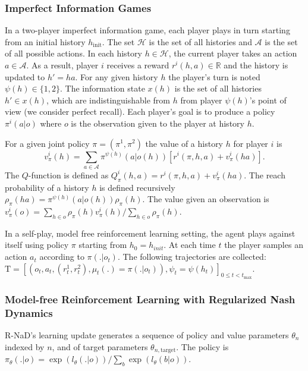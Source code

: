 \subsubsection{Imperfect Information Games}
In a two-player imperfect information game, each player plays in turn starting from an initial history $h_{\textrm{init}}$. The set $\mathcal{H}$ is the set of all histories and $\mathcal{A}$ is the set of all possible actions. In each history $h\in \mathcal{H}$, the current player takes an action $a\in \mathcal{A}$. As a result, player $i$ receives a reward $r^i(h, a)\in \mathbb{R}$ and the history is updated to $h'=ha$. For any given history $h$ the player's turn is noted $\psi(h) \in \{1, 2\}$. The information state $x(h)$ is the set of all histories $h' \in x(h)$, which are indistinguishable from $h$ from player $\psi(h)$'s point of view (we consider perfect recall). Each player's goal is to produce a policy $\pi^i(a|o)$ where $o$ is the observation given to the player at history $h$.

For a given joint policy $\pi = (\pi^1, \pi^2)$ the value of a history $h$ for player $i$ is
$$v^i_\pi(h) = \sum_{a \in \mathcal{A}} \pi^{\psi(h)}(a|o(h))\left[r^i(\pi, h, a) + v^i_\pi(ha)\right].$$
The $Q$-function is defined as $Q^i_\pi(h, a) = r^i(\pi, h, a) + v^i_\pi(ha)$. The reach probability of a history $h$ is defined recursively $\rho_\pi(ha) = \pi^{\psi(h)}(a|o(h))\rho_\pi(h)$. The value given an observation is $v^i_\pi(o) = \sum_{h\in o}\rho_\pi(h) v^i_\pi(h) / \sum_{h\in o}\rho_\pi(h)$.

In a self-play, model free reinforcement learning setting, the agent plays against itself using policy $\pi$ starting from $h_0 = h_{init}$. At each time $t$ the player samples an action $a_t$ according to $\pi(.|o_t)$. The following trajectories are collected: $\mathrm{T} = [(o_t, a_t, (r^1_t, r^2_t), \mu_t(.)=\pi(.|o_t)), \psi_t=\psi(h_t)]_{0\leq t <t_{\textrm{max}}}$.

\subsubsection{Model-free Reinforcement Learning with Regularized Nash Dynamics}
R-NaD's learning update generates a sequence of policy and value parameters $\theta_n$ indexed by $n$, and of target parameters $\theta_{n, \textrm{target}}$. The policy is $\pi_\theta(.|o) = \exp(l_\theta(.|o)) / \sum_b \exp(l_\theta(b|o))$.

